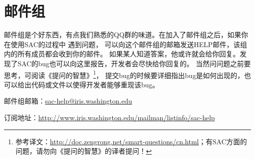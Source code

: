 \section{邮件组}
邮件组是个好东西，有点我们熟悉的QQ群的味道。在加入了邮件组之后，如果你在使用SAC的过程中
遇到问题，
可以向这个邮件组的邮箱发送HELP邮件，该组内的所有成员都会收到你的邮件。
如果某人知道答案，他或许就会给你回复。发现了SAC的bug也可以向这里报告，开发者会尽快给你回复的。
当然问问题之前要思考，可阅读《提问的智慧》\footnote{参考译文：\url{http://doc.zengrong.net/smart-questions/cn.html}；有SAC方面的问题，请勿向《提问的智慧》的译者提问！}，
提交bug的时候要详细指出bug是如何出现的，也可以给出代码或文件以使得开发者能够重现该bug。

邮件组邮箱：\url{sac-help@iris.washington.edu}

订阅地址：\small{\url{http://www.iris.washington.edu/mailman/listinfo/sac-help}}
